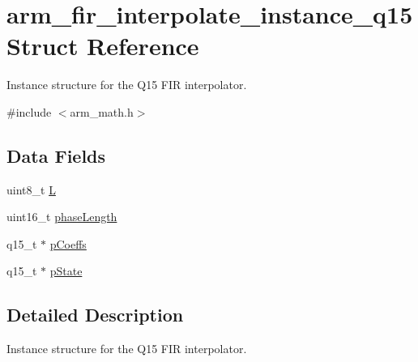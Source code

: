 \hypertarget{structarm__fir__interpolate__instance__q15}{\section{arm\-\_\-fir\-\_\-interpolate\-\_\-instance\-\_\-q15 Struct Reference}
\label{structarm__fir__interpolate__instance__q15}
}


Instance structure for the Q15 F\-I\-R interpolator.  




{\ttfamily \#include $<$arm\-\_\-math.\-h$>$}

\subsection*{Data Fields}
\begin{DoxyCompactItemize}
\item 
uint8\-\_\-t \hyperlink{structarm__fir__interpolate__instance__q15_aee73cc056696e504430c53eaa9c58cf0}{L}
\item 
uint16\-\_\-t \hyperlink{structarm__fir__interpolate__instance__q15_a8f92bb07e0812f94679438cdf412b26a}{phase\-Length}
\item 
q15\-\_\-t $\ast$ \hyperlink{structarm__fir__interpolate__instance__q15_a7ca181a37f714d174445f486bebce26f}{p\-Coeffs}
\item 
q15\-\_\-t $\ast$ \hyperlink{structarm__fir__interpolate__instance__q15_ae29dfdb736374fcddaeaec4b7770170c}{p\-State}
\end{DoxyCompactItemize}


\subsection{Detailed Description}
Instance structure for the Q15 F\-I\-R interpolator. 

